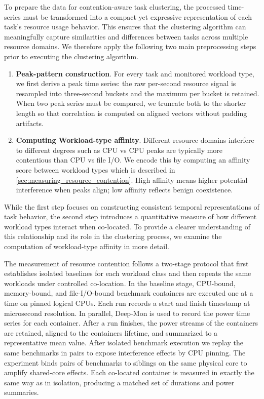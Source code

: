 \label{sec:data_preprocessing_clustering}

To prepare the data for contention-aware task clustering, the processed time-series must be transformed into a compact yet expressive representation of each task's resource usage behavior. This ensures that the clustering algorithm can meaningfully capture similarities and differences between tasks across multiple resource domains. We therefore apply the following two main preprocessing steps prior to executing the clustering algorithm.

\begin{enumerate}
    \item \textbf{Peak-pattern construction}. For every task and monitored workload type, we first derive a peak time series: the raw per-second resource signal is resampled into three-second buckets and the maximum per bucket is retained. When two peak series must be compared, we truncate both to the shorter length so that correlation is computed on aligned vectors without padding artifacts.
    \item \textbf{Computing Workload-type affinity}. Different resource domains interfere to different degrees such as CPU vs CPU peaks are typically more contentious than CPU vs file I/O. We encode this by computing an affinity score between workload types which is described in \ref{sec:measuring_resource_contention}. High affinity means higher potential interference when peaks align; low affinity reflects benign coexistence.
\end{enumerate}

While the first step focuses on constructing consistent temporal representations of task behavior, the second step introduces a quantitative measure of how different workload types interact when co-located. To provide a clearer understanding of this relationship and its role in the clustering process, we examine the computation of workload-type affinity in more detail.

\label{sec:measuring_resource_contention}

The measurement of resource contention follows a two-stage protocol that first establishes isolated baselines for each workload class and then repeats the same workloads under controlled co-location. In the baseline stage, CPU-bound, memory-bound, and file-I/O-bound benchmark containers are executed one at a time on pinned logical CPUs. Each run records a start and finish timestamp at microsecond resolution. In parallel, Deep-Mon is used to record the power time series for each container. After a run finishes, the power streams of the containers are retained, aligned to the containers lifetime, and summarized to a representative mean value.
After isolated benchmark execution we replay the same benchmarks in pairs to expose interference effects by CPU pinning. The experiment binds pairs of benchmarks to siblings on the same physical core to amplify shared-core effects. Each co-located container is measured in exactly the same way as in isolation, producing a matched set of durations and power summaries.

